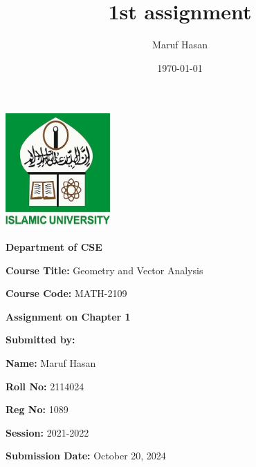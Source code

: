 \documentclass{article}
\title{1st assignment}
\author{Maruf Hasan}
\date{\today}
\begin{document}
\begin{titlepage}
    
    \begin{center}
        \vspace{2cm}
        \includegraphics[width=0.3\textwidth]{IU logo.jpg}\par
        \vspace{0.5cm}
        {\huge\textbf{Department of CSE}}\par
        \vspace{1cm}
        {\Large\textbf{Course Title:} Geometry and Vector Analysis\par}
        
        {\Large\textbf{Course Code:}  MATH-2109\par}
        \vspace{1cm}
        {\huge\textbf{Assignment on Chapter 1}\par}
        \vspace{2cm}
        \Large\textbf{Submitted by:}\par
        \textbf{Name:} Maruf Hasan\par
        \textbf{Roll No:} 2114024\par
        \textbf{Reg No:} 1089\par
        \textbf{Session:} 2021-2022\par
        \vspace{2cm}
        \Large\textbf{Submission Date:} October 20, 2024\par
    \end{center}
\end{titlepage}

\newpage
\end{document}
